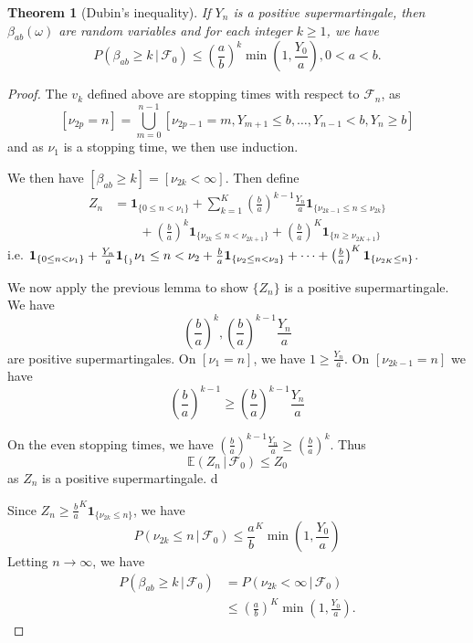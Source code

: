 \documentclass[10pt, oneside, reqno]{amsart}
\theoremstyle{plain}%
\newtheorem{thm}{Theorem}[section]
\theoremstyle{definition}
\theoremstyle{remark}
\newcommand{\given}{ \, | \,}
\newcommand{\sigf}{\mathcal{F}}
\newcommand{\E}{\mathbb{E}}
\newcommand{\indic}[1]{\mathbf{1}_{\{ #1 \}} }
\begin{document}
\begin{thm}[Dubin's inequality] If $Y_n$ is a positive supermartingale, then $\beta_{ab}(\omega)$ are random variables and for each integer $k \geq 1$, we have \[
    P(\beta_{ab} \geq k \given \sigf_0) \leq (\frac{a}{b})^k \min(1, \frac{Y_0}{a}), 0 < a < b.
\]  
\end{thm} 
\begin{proof}
    The $v_k$ defined above are stopping times with respect to $\sigf_n$, as \[ 
        [\nu_{2p} = n] = \bigcup_{m=0}^{n-1} [\nu_{2p-1} = m, Y_{m+1} \leq b, \dots, Y_{n-1} < b, Y_n \geq b ]
\] and as $\nu_1$ is a stopping time, we then use induction.   

    We then have $[\beta_{ab} \geq k] = [\nu_{2k} < \infty]$.  Then define \begin{align*}
        Z_n &= \indic{0 \leq n < \nu_1} + \sum_{k=1}^K (\frac{b}{a})^{k-1} \frac{Y_n}{a} \indic{\nu_{2k-1} \leq n \leq \nu_{2k}} \\
            &\qquad + \left(\frac{b}{a}\right)^k \indic{\nu_{2k} \leq n < \nu_{2k+1}} + \left( \frac{b}{a} \right)^K \indic{n \geq \nu_{2K+1}}
    \end{align*} 
    i.e. $\indic{0 \leq n < \nu_1} + \frac{Y_n}{a} \indic_{\nu_1 \leq n < \nu_2} + \frac{b}{a} \indic{\nu_2 \leq n < \nu_3} + \dots + \left( \frac{b}{a} \right)^K \indic{\nu_{2K} \leq n}$. 
    
    We now apply the previous lemma to show $\{ Z_n \}$ is a positive supermartingale.  We have \[
        \left( \frac{b}{a} \right)^k, \left( \frac{b}{a} \right)^{k-1} \frac{Y_n}{a}
    \] are positive supermartingales.  On $[ \nu_1 = n]$, we have $1 \geq \frac{Y_n}{a}$.  On $[\nu_{2k-1} = n]$ we have \[
        \left(\frac{b}{a} \right)^{k-1} \geq \left(\frac{b}{a} \right)^{k-1} \frac{Y_n}{a}
    \]
    
    On the even stopping times, we have $\left(\frac{b}{a} \right)^{k-1} \frac{Y_n}{a} \geq \left(\frac{b}{a} \right)^{k}$.  Thus \[
        \E(Z_n \given \sigf_0) \leq Z_0
    \] as $Z_n$ is a positive supermartingale. d
    
    Since $Z_n \geq \frac{b}{a}^K \indic{\nu_{2k} \leq n}$, we have \[
        P(\nu_{2k} \leq n \, | \, \sigf_0) \leq \frac{a}{b}^K \min(1, \frac{Y_0}{a}) 
    \]  Letting $n \rightarrow \infty$, we have 
    \begin{align*}
        P(\beta_{ab} \geq k \given \sigf_0) &= P(\nu_{2k} < \infty \given \sigf_0) \\
                &\leq \left( \frac{a}{b} \right)^K \min(1, \frac{Y_0}{a}).  
    \end{align*}
\end{proof}
\end{document}
